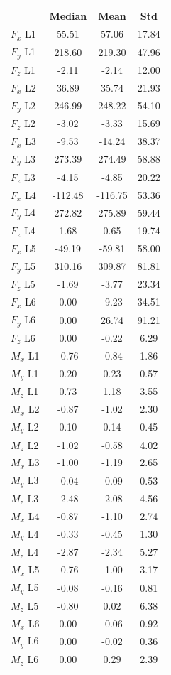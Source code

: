 \begin{table}[h]
\centering
\begin{tabular}{lccc}
\toprule
 & \bfseries Median & \bfseries Mean & \bfseries Std \\
\midrule
$F_x$ L1 & 55.51 & 57.06 & 17.84 \\
$F_y$ L1 & 218.60 & 219.30 & 47.96 \\
$F_z$ L1 & -2.11 & -2.14 & 12.00 \\
$F_x$ L2 & 36.89 & 35.74 & 21.93 \\
$F_y$ L2 & 246.99 & 248.22 & 54.10 \\
$F_z$ L2 & -3.02 & -3.33 & 15.69 \\
$F_x$ L3 & -9.53 & -14.24 & 38.37 \\
$F_y$ L3 & 273.39 & 274.49 & 58.88 \\
$F_z$ L3 & -4.15 & -4.85 & 20.22 \\
$F_x$ L4 & -112.48 & -116.75 & 53.36 \\
$F_y$ L4 & 272.82 & 275.89 & 59.44 \\
$F_z$ L4 & 1.68 & 0.65 & 19.74 \\
$F_x$ L5 & -49.19 & -59.81 & 58.00 \\
$F_y$ L5 & 310.16 & 309.87 & 81.81 \\
$F_z$ L5 & -1.69 & -3.77 & 23.34 \\
$F_x$ L6 & 0.00 & -9.23 & 34.51 \\
$F_y$ L6 & 0.00 & 26.74 & 91.21 \\
$F_z$ L6 & 0.00 & -0.22 & 6.29 \\
$M_x$ L1 & -0.76 & -0.84 & 1.86 \\
$M_y$ L1 & 0.20 & 0.23 & 0.57 \\
$M_z$ L1 & 0.73 & 1.18 & 3.55 \\
$M_x$ L2 & -0.87 & -1.02 & 2.30 \\
$M_y$ L2 & 0.10 & 0.14 & 0.45 \\
$M_z$ L2 & -1.02 & -0.58 & 4.02 \\
$M_x$ L3 & -1.00 & -1.19 & 2.65 \\
$M_y$ L3 & -0.04 & -0.09 & 0.53 \\
$M_z$ L3 & -2.48 & -2.08 & 4.56 \\
$M_x$ L4 & -0.87 & -1.10 & 2.74 \\
$M_y$ L4 & -0.33 & -0.45 & 1.30 \\
$M_z$ L4 & -2.87 & -2.34 & 5.27 \\
$M_x$ L5 & -0.76 & -1.00 & 3.17 \\
$M_y$ L5 & -0.08 & -0.16 & 0.81 \\
$M_z$ L5 & -0.80 & 0.02 & 6.38 \\
$M_x$ L6 & 0.00 & -0.06 & 0.92 \\
$M_y$ L6 & 0.00 & -0.02 & 0.36 \\
$M_z$ L6 & 0.00 & 0.29 & 2.39 \\
\bottomrule
\end{tabular}
\end{table}
